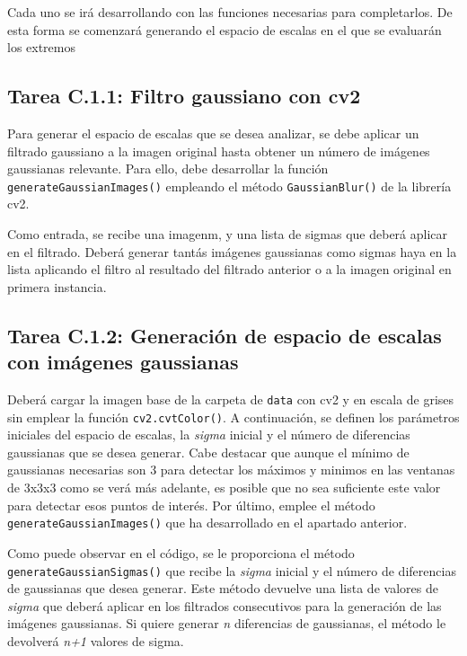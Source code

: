 Cada uno se irá desarrollando con las funciones necesarias para completarlos. De esta forma se comenzará generando el espacio de escalas en el que se evaluarán los extremos

\subsection*{Tarea C.1.1: Filtro gaussiano con cv2}
{}

Para generar el espacio de escalas que se desea analizar, se debe aplicar un filtrado gaussiano a la imagen original hasta obtener un número de imágenes gaussianas relevante. Para ello, debe desarrollar la función \texttt{generateGaussianImages()} empleando el método \texttt{GaussianBlur()} de la librería cv2.

Como entrada, se recibe una imagenm, y una lista de sigmas que deberá aplicar en el filtrado. Deberá generar tantás imágenes gaussianas como sigmas haya en la lista aplicando el filtro al resultado del filtrado anterior o a la imagen original en primera instancia.

\subsection*{Tarea C.1.2: Generación de espacio de escalas con imágenes gaussianas}

Deberá cargar la imagen base de la carpeta de \texttt{data} con cv2 y en escala de grises sin emplear la función \texttt{cv2.cvtColor()}. A continuación, se definen los parámetros iniciales del espacio de escalas, la \textit{sigma} inicial y el número de diferencias gaussianas que se desea generar. Cabe destacar que aunque el mínimo de gaussianas necesarias son 3 para detectar los máximos y minimos en las ventanas de 3x3x3 como se verá más adelante, es posible que no sea suficiente este valor para detectar esos puntos de interés. Por último, emplee el método \texttt{generateGaussianImages()} que ha desarrollado en el apartado anterior.

Como puede observar en el código, se le proporciona el método \texttt{generateGaussianSigmas()} que recibe la \textit{sigma} inicial y el número de diferencias de gaussianas que desea generar. Este método devuelve una lista de valores de \textit{sigma} que deberá aplicar en los filtrados consecutivos para la generación de las imágenes gaussianas. Si quiere generar \textit{n} diferencias de gaussianas, el método le devolverá \textit{n+1} valores de sigma.

